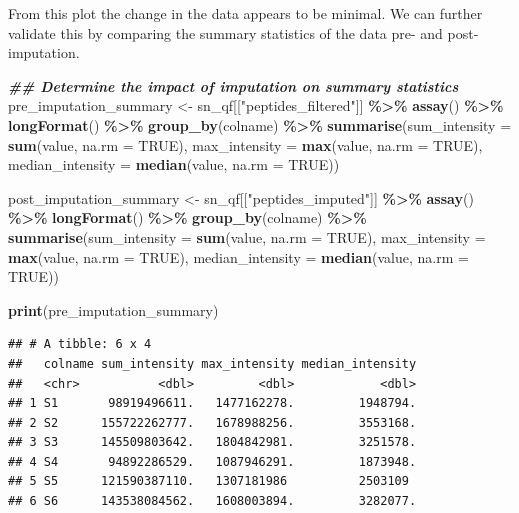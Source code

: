 \documentclass[9pt,a4paper,]{extarticle}
\newenvironment{Shaded}{\begin{snugshade}}{\end{snugshade}}
\newcommand{\AttributeTok}[1]{\textcolor[rgb]{0.13,0.29,0.53}{#1}}
\newcommand{\ConstantTok}[1]{\textcolor[rgb]{0.56,0.35,0.01}{#1}}
\newcommand{\DocumentationTok}[1]{\textcolor[rgb]{0.56,0.35,0.01}{\textbf{\textit{#1}}}}
\newcommand{\FunctionTok}[1]{\textcolor[rgb]{0.13,0.29,0.53}{\textbf{#1}}}
\newcommand{\NormalTok}[1]{#1}
\newcommand{\OtherTok}[1]{\textcolor[rgb]{0.56,0.35,0.01}{#1}}
\newcommand{\SpecialCharTok}[1]{\textcolor[rgb]{0.81,0.36,0.00}{\textbf{#1}}}
\newcommand{\StringTok}[1]{\textcolor[rgb]{0.31,0.60,0.02}{#1}}
\begin{document}
From this plot the change in the data appears to be minimal. We can further
validate this by comparing the summary statistics of the data pre- and post-
imputation.

\begin{Shaded}
\begin{Highlighting}[]
\DocumentationTok{\#\# Determine the impact of imputation on summary statistics}
\NormalTok{pre\_imputation\_summary }\OtherTok{\textless{}{-}}\NormalTok{ sn\_qf[[}\StringTok{"peptides\_filtered"}\NormalTok{]] }\SpecialCharTok{\%\textgreater{}\%}
  \FunctionTok{assay}\NormalTok{() }\SpecialCharTok{\%\textgreater{}\%}
  \FunctionTok{longFormat}\NormalTok{() }\SpecialCharTok{\%\textgreater{}\%}
  \FunctionTok{group\_by}\NormalTok{(colname) }\SpecialCharTok{\%\textgreater{}\%}
  \FunctionTok{summarise}\NormalTok{(}\AttributeTok{sum\_intensity =} \FunctionTok{sum}\NormalTok{(value, }\AttributeTok{na.rm =} \ConstantTok{TRUE}\NormalTok{),}
            \AttributeTok{max\_intensity =} \FunctionTok{max}\NormalTok{(value, }\AttributeTok{na.rm =} \ConstantTok{TRUE}\NormalTok{),}
            \AttributeTok{median\_intensity =} \FunctionTok{median}\NormalTok{(value, }\AttributeTok{na.rm =} \ConstantTok{TRUE}\NormalTok{))}

\NormalTok{post\_imputation\_summary }\OtherTok{\textless{}{-}}\NormalTok{ sn\_qf[[}\StringTok{"peptides\_imputed"}\NormalTok{]] }\SpecialCharTok{\%\textgreater{}\%}
  \FunctionTok{assay}\NormalTok{() }\SpecialCharTok{\%\textgreater{}\%}
  \FunctionTok{longFormat}\NormalTok{() }\SpecialCharTok{\%\textgreater{}\%}
  \FunctionTok{group\_by}\NormalTok{(colname) }\SpecialCharTok{\%\textgreater{}\%}
  \FunctionTok{summarise}\NormalTok{(}\AttributeTok{sum\_intensity =} \FunctionTok{sum}\NormalTok{(value, }\AttributeTok{na.rm =} \ConstantTok{TRUE}\NormalTok{),}
            \AttributeTok{max\_intensity =} \FunctionTok{max}\NormalTok{(value, }\AttributeTok{na.rm =} \ConstantTok{TRUE}\NormalTok{),}
            \AttributeTok{median\_intensity =} \FunctionTok{median}\NormalTok{(value, }\AttributeTok{na.rm =} \ConstantTok{TRUE}\NormalTok{))}

\FunctionTok{print}\NormalTok{(pre\_imputation\_summary)}
\end{Highlighting}
\end{Shaded}

\begin{verbatim}
## # A tibble: 6 x 4
##   colname sum_intensity max_intensity median_intensity
##   <chr>           <dbl>         <dbl>            <dbl>
## 1 S1       98919496611.   1477162278.         1948794.
## 2 S2      155722262777.   1678988256.         3553168.
## 3 S3      145509803642.   1804842981.         3251578.
## 4 S4       94892286529.   1087946291.         1873948.
## 5 S5      121590387110.   1307181986          2503109 
## 6 S6      143538084562.   1608003894.         3282077.
\end{verbatim}
\end{document}
